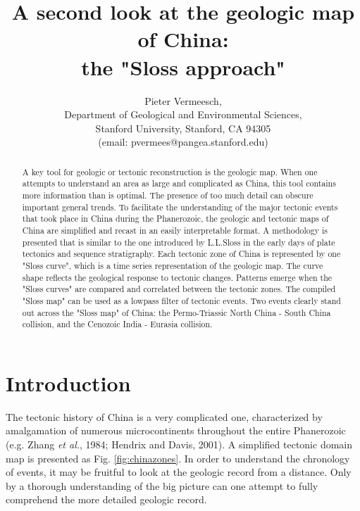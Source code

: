 \documentclass{article}
\title{A  second look  at  the  geologic map  of  China: 
\\the  "Sloss approach"}
\author{Pieter Vermeesch,\\
Department of Geological and Environmental Sciences,\\
Stanford University, Stanford, CA 94305\\
(email: pvermees@pangea.stanford.edu)}
\date{}
\begin{document}
 \maketitle

 \begin{abstract}

A key  tool for  geologic or tectonic  reconstruction is  the geologic
map.  When one attempts to understand an area as large and complicated
as China,  this tool  contains more information  than is  optimal. The
presence of too  much detail can obscure important  general trends. To
facilitate the  understanding of the  major tectonic events  that took
place in China during the  Phanerozoic, the geologic and tectonic maps
of China are simplified and  recast in an easily interpretable format.
A methodology  is presented that is  similar to the  one introduced by
L.L.Sloss  in   the  early  days  of  plate   tectonics  and  sequence
stratigraphy. Each tectonic zone of China is represented by one "Sloss
curve", which is a time series representation of the geologic map. The
curve   shape   reflects   the   geological   response   to   tectonic
changes.  Patterns emerge  when the  "Sloss curves"  are  compared and
correlated between the tectonic zones. The compiled "Sloss map" can be
used as a lowpass filter of tectonic events.  Two events clearly stand
out across the "Sloss map"  of China: the Permo-Triassic North China -
South China collision, and the Cenozoic India - Eurasia collision.
 \end{abstract}

 \section*{Introduction} \label{sec:introduction}

 \indent  The tectonic  history of  China is  a very  complicated one,
 characterized by amalgamation  of numerous microcontinents throughout
 the entire  Phanerozoic (e.g.  Zhang  {\it et al.}, 1984;  Hendrix and
 Davis, 2001). A  simplified tectonic domain map is  presented as Fig.
 \ref{fig:chinazones}.   In  order  to  understand the  chronology  of
 events, it  may be  fruitful to  look at the  geologic record  from a
 distance. Only by a thorough understanding of the big picture can one
 attempt to fully comprehend the more detailed geologic record.  \\
\end{document}
